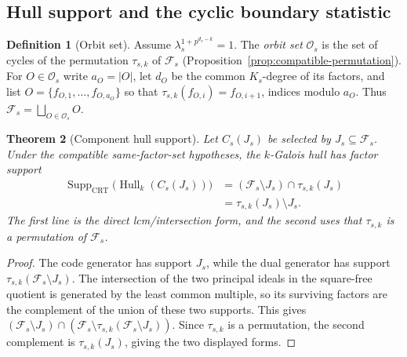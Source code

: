 \documentclass[10pt,a4paper]{article}
\newcommand{\Fs}{\mathcal F_s}
\newcommand{\Os}{\mathcal O_s}
\newcommand{\Hull}{\operatorname{Hull}}
\numberwithin{equation}{section}
\theoremstyle{plain}
\newtheorem{theorem}{Theorem}[section]
\theoremstyle{definition}
\newtheorem{definition}[theorem]{Definition}
\theoremstyle{remark}
\begin{document}
\subsection{Hull support and the cyclic boundary statistic}\label{sec:support}

\begin{definition}[Orbit set]\label{def:orbits}
Assume $\lambda_s^{1+p^{d_s-k}}=1$. The \emph{orbit set} $\Os$ is the set of
cycles of the permutation $\tau_{s,k}$ of $\Fs$
(Proposition~\ref{prop:compatible-permutation}). For $O\in\Os$ write
$a_O=|O|$, let $d_O$ be the common $K_s$-degree of its factors, and list
$O=\{f_{O,1},\dots,f_{O,a_O}\}$ so that
$\tau_{s,k}(f_{O,i})=f_{O,i+1}$, indices modulo $a_O$. Thus
$\Fs=\bigsqcup_{O\in\Os}O$.
\end{definition}

\begin{theorem}[Component hull support]\label{thm:hull-support}
Let $C_s(J_s)$ be selected by $J_s\subseteq\Fs$. Under the compatible
same-factor-set hypotheses, the $k$-Galois hull has factor support
\begin{equation}\label{eq:support}
\begin{aligned}
\operatorname{Supp}_{\mathrm{CRT}}\bigl(\Hull_k(C_s(J_s))\bigr)
 &= (\Fs\setminus J_s)\cap\tau_{s,k}(J_s)\\
 &= \tau_{s,k}(J_s)\setminus J_s.
\end{aligned}
\end{equation}
The first line is the direct lcm/intersection form, and the second uses that
$\tau_{s,k}$ is a permutation of $\Fs$.
\end{theorem}

\begin{proof}
The code generator has support $J_s$, while the dual generator has support
$\tau_{s,k}(\Fs\setminus J_s)$. The intersection of the two principal ideals in
the square-free quotient is generated by the least common multiple, so its
surviving factors are the complement of the union of these two supports. This
gives
$(\Fs\setminus J_s)\cap(\Fs\setminus\tau_{s,k}(\Fs\setminus J_s))$.
Since $\tau_{s,k}$ is a permutation, the second complement is $\tau_{s,k}(J_s)$,
giving the two displayed forms.
\end{proof}
\end{document}
